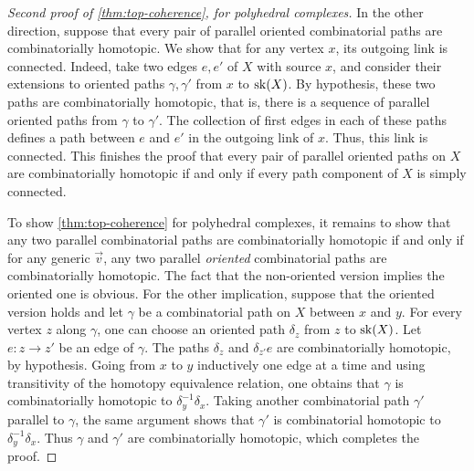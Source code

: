 \begin{proof}[Second proof of {\cref{thm:top-coherence}}, for polyhedral complexes]
    In the other direction, suppose that every pair of parallel oriented combinatorial paths are combinatorially homotopic. 
    We show that for any vertex $x$, its outgoing link is connected. 
    Indeed, take two edges $e,e'$ of $X$ with source $x$, and consider their extensions to oriented paths $\gamma, \gamma'$ from $x$ to $\mathrm{sk}(X)$. 
    By hypothesis, these two paths are combinatorially homotopic, that is, there is a sequence of parallel oriented paths from $\gamma$ to $\gamma'$. 
    The collection of first edges in each of these paths defines a path between $e$ and $e'$ in the outgoing link of $x$. 
    Thus, this link is connected. 
    This finishes the proof that every pair of parallel oriented paths on $X$ are combinatorially homotopic if and only if every path component of $X$ is simply connected.

    To show \cref{thm:top-coherence} for polyhedral complexes, it remains to show that any two parallel combinatorial paths are combinatorially homotopic if and only if for any generic $\vec v$, any two parallel \emph{oriented} combinatorial paths are combinatorially homotopic. 
    The fact that the non-oriented version implies the oriented one is obvious. 
    For the other implication, suppose that the oriented version holds and let $\gamma$ be a combinatorial path on $X$ between $x$ and $y$.
    For every vertex $z$ along $\gamma$, one can choose an oriented path $\delta_z$ from $z$ to $\mathrm{sk}(X)$. 
    Let $e: z \to z'$ be an edge of $\gamma$. 
    The paths $\delta_z$ and $\delta_{z'}e$ are combinatorially homotopic, by hypothesis. 
    Going from $x$ to $y$ inductively one edge at a time and using transitivity of the homotopy equivalence relation, one obtains that $\gamma$ is combinatorially homotopic to $\delta_y^{-1}\delta_x$. 
    Taking another combinatorial path $\gamma'$ parallel to $\gamma$, the same argument shows that $\gamma'$ is combinatorial homotopic to $\delta_y^{-1}\delta_x$.
    Thus $\gamma$ and $\gamma'$ are combinatorially homotopic, which completes the proof. 
\end{proof}